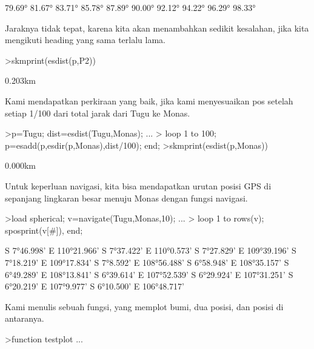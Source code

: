\documentclass{article}
\begin{document}
\begin{eulernotebook}
\begin{eulercomment}
\begin{eulercomment}
\begin{eulercomment}
\begin{eulercomment}
\begin{euleroutput}
       79.69°
       81.67°
       83.71°
       85.78°
       87.89°
       90.00°
       92.12°
       94.22°
       96.29°
       98.33°
\end{euleroutput}
\begin{eulercomment}
Jaraknya tidak tepat, karena kita akan menambahkan sedikit kesalahan,
jika kita mengikuti heading yang sama terlalu lama.
\end{eulercomment}
\begin{eulerprompt}
>skmprint(esdist(p,P2))
\end{eulerprompt}
\begin{euleroutput}
       0.203km
\end{euleroutput}
\begin{eulercomment}
Kami mendapatkan perkiraan yang baik, jika kami menyesuaikan pos
setelah setiap 1/100 dari total jarak dari Tugu ke Monas.
\end{eulercomment}
\begin{eulerprompt}
>p=Tugu; dist=esdist(Tugu,Monas); ...
>  loop 1 to 100; p=esadd(p,esdir(p,Monas),dist/100); end;
>skmprint(esdist(p,Monas))
\end{eulerprompt}
\begin{euleroutput}
       0.000km
\end{euleroutput}
\begin{eulercomment}
Untuk keperluan navigasi, kita bisa mendapatkan urutan posisi GPS di
sepanjang lingkaran besar menuju Monas dengan fungsi navigasi.
\end{eulercomment}
\begin{eulerprompt}
>load spherical; v=navigate(Tugu,Monas,10); ...
>  loop 1 to rows(v); sposprint(v[#]), end;
\end{eulerprompt}
\begin{euleroutput}
  S 7°46.998' E 110°21.966'
  S 7°37.422' E 110°0.573'
  S 7°27.829' E 109°39.196'
  S 7°18.219' E 109°17.834'
  S 7°8.592' E 108°56.488'
  S 6°58.948' E 108°35.157'
  S 6°49.289' E 108°13.841'
  S 6°39.614' E 107°52.539'
  S 6°29.924' E 107°31.251'
  S 6°20.219' E 107°9.977'
  S 6°10.500' E 106°48.717'
\end{euleroutput}
\begin{eulercomment}
Kami menulis sebuah fungsi, yang memplot bumi, dua posisi, dan posisi
di antaranya.
\end{eulercomment}
\begin{eulerprompt}
>function testplot ...
\end{eulerprompt}

\end{eulercomment}
\end{eulercomment}
\end{eulercomment}
\end{eulercomment}
\end{eulernotebook}
\end{document}
